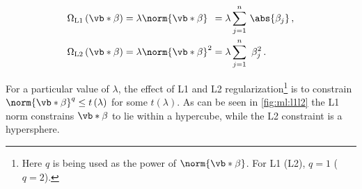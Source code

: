 \begin{subequations} \label{eq:L1_L2}
\begin{align}
\Omega_{\text{L1}}\left(\vb*{\beta}\right) &= \lambda \norm{\vb*{\beta}}\hphantom{^{1}}
= \lambda \sum_{j=1}^{n} \, \abs{\beta_{j}}\,, \label{eq:L1} \\
\Omega_{\text{L2}}\left(\vb*{\beta}\right) &= \lambda \norm{\vb*{\beta}}^{2}
= \lambda \sum_{j=1}^{n} \,\, \beta_{j}^{2}\,. \label{eq:L2}
\end{align}
\end{subequations}

For a particular value of $\lambda$, the effect of L1 and L2 regularization\footnote{Here
$q$ is being used as the power of $\norm{\vb*{\beta}}$. For L1 (L2), $q=1$ ($q=2$).} is
to constrain $\norm{\vb*{\beta}}^{q} \leq t\left(\lambda\right)$ for some $t\left(\lambda\right)$.
As can be seen in \cref{fig:ml:l1l2} the L1 norm constrains $\vb*{\beta}$ to lie within a hypercube,
while the L2 constraint is a hypersphere.

